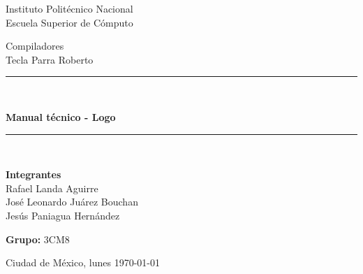 \begin{center}
	\vspace*{0.0in}
	\begin{large}
		Instituto Politécnico Nacional\\                %
		\vspace*{0.2in}
		Escuela Superior de Cómputo\\                   %
		\vspace*{0.6in}
		
	\end{large}
	\begin{large}
		Compiladores \\	                       			%
		\vspace*{0.2in}
		Tecla Parra Roberto\\                 			%
		\vspace*{0.8in}
		
	\end{large}
	\rule{150mm}{0.1mm}\\
	\vspace*{0.2in}
	\begin{Large}
		\textbf{Manual técnico - Logo} \\     			%
        \vspace*{0.2in}
        
	\end{Large}
	\vspace*{0.2in}
	\rule{150mm}{0.1mm}\\
	\begin{large}
		\vspace*{0.3in}
		
		\textbf{Integrantes} \\
		Rafael Landa Aguirre\\
		José Leonardo Juárez Bouchan\\
		Jesús Paniagua Hernández\\
	\end{large}
	\begin{large}
		\vspace*{0.35in}
		\textbf{Grupo:} 3CM8 \\
		\vspace*{0.4in}
		
		Ciudad de México, lunes \today\\     			%
	\end{large}
\end{center}